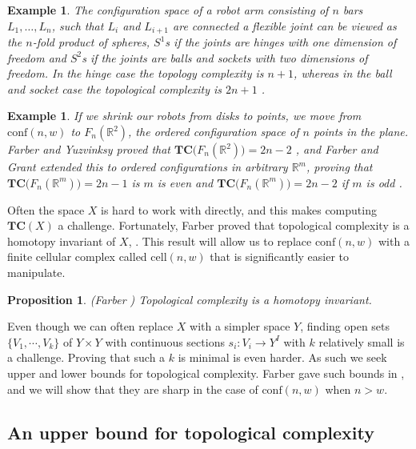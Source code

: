 \documentclass[pagebackref,colorlinks,citecolor=blue,linkcolor=blue,urlcolor=blue,filecolor=blue]{article}
\newtheorem{prop}[thm]{Proposition}
\newtheorem{exam}[thm]{Example}
\theoremstyle{definition}\newtheorem{definition}[thm]{Definition}
\theoremstyle{definition}
\newcommand{\R}{\ensuremath{\mathbb{R}}}
\begin{document}
\begin{exam}
The configuration space of a robot arm consisting of $n$ bars $L_{1}, \dots, L_{n}$, such that $L_{i}$ and $L_{i+1}$ are connected a flexible joint can be viewed as the $n$-fold product of spheres, $S^{1}$s if the joints are hinges with one dimension of freedom and $S^{2}$s if the joints are balls and sockets with two dimensions of freedom.
In the hinge case the topology complexity is $n+1$, whereas in the ball and socket case the topological complexity is $2n+1$ \cite[Theorem 12]{farber2003topological}.
\end{exam}

\begin{exam}
If we shrink our robots from disks to points, we move from $\text{conf}(n,w)$ to $F_{n}(\R^{2})$, the ordered configuration space of $n$ points in the plane.
Farber and Yuzvinksy proved that $\textbf{TC}\big(F_{n}(\R^{2})\big)=2n-2$ \cite[Theorem 1]{farber2002topological}, and Farber and Grant extended this to ordered configurations in arbitrary $\R^{m}$, proving that $\textbf{TC}\big(F_{n}(\R^{m})\big)=2n-1$ is $m$ is even and $\textbf{TC}\big(F_{n}(\R^{m})\big)=2n-2$ if $m$ is odd \cite[Theorem 1]{farber2009topological}.
\end{exam}

Often the space $X$ is hard to work with directly, and this makes computing $\textbf{TC}(X)$ a challenge.
Fortunately, Farber proved that topological complexity is a homotopy invariant of $X$, \cite[Theorem 3]{farber2003topological}.
This result will allow us to replace $\text{conf}(n,w)$ with a finite cellular complex called $\text{cell}(n,w)$ that is significantly easier to manipulate.

\begin{prop}\label{TC is homotopy invariant}
(Farber \cite[Theorem 3]{farber2003topological}) Topological complexity is a homotopy invariant.
\end{prop}

Even though we can often replace $X$ with a simpler space $Y$, finding open sets $\{V_{1}, \cdots, V_{k}\}$ of $Y\times Y$ with continuous sections $s_{i}:V_{i}\to Y^{I}$ with $k$ relatively small is a challenge.
Proving that such a $k$ is minimal is even harder.
As such we seek upper and lower bounds for topological complexity.
Farber gave such bounds in \cite[Sections 3 and 4]{farber2003topological}, and we will show that they are sharp in the case of $\text{conf}(n,w)$ when $n>w$.

\subsection{An upper bound for topological complexity}
\end{document}

